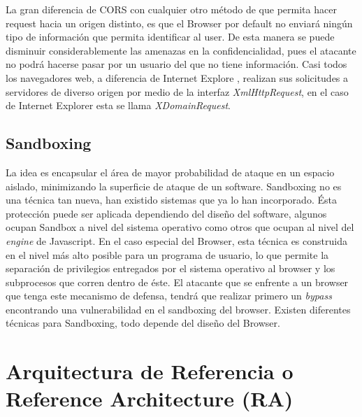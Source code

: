         La gran diferencia de CORS con cualquier otro método de que permita hacer request hacia un origen distinto, es que el Browser por default no enviará ningún tipo de información que permita identificar al user. De esta manera se puede disminuir considerablemente las amenazas en la confidencialidad, pues el atacante no podrá hacerse pasar por un usuario del que no tiene información. Casi todos los navegadores web, a diferencia de Internet Explore \cite{bookWebAppSec}, realizan sus solicitudes a servidores de diverso origen por medio de la interfaz \textit{XmlHttpRequest}, en el caso de Internet Explorer esta se llama \textit{XDomainRequest}.


    \subsection{Sandboxing}
    \label{chap2:Sandboxing}
    La idea es encapsular el área de mayor probabilidad de ataque en un espacio aislado, minimizando la superficie de ataque de un software. Sandboxing no es una técnica tan nueva, han existido sistemas que ya lo han incorporado. Ésta protección puede ser aplicada dependiendo del diseño del software, algunos ocupan Sandbox a nivel del sistema operativo como otros que ocupan al nivel del \textit{engine} de Javascript. En el caso especial del Browser, esta técnica es construida en el nivel más alto posible para un programa de usuario, lo que permite la separación de privilegios entregados por el sistema operativo al browser y los subprocesos que corren dentro de éste. El atacante que se enfrente a un browser que tenga este mecanismo de defensa, tendrá que realizar primero un \textit{bypass} encontrando una vulnerabilidad en el sandboxing del browser. Existen diferentes técnicas para Sandboxing, todo depende del diseño del Browser.




\section{Arquitectura de Referencia o Reference Architecture (RA)}
\label{chap2:ArqRef}

